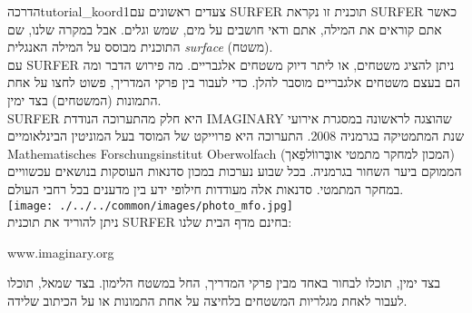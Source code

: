 \begin{surferIntroPage}{הדרכה}{tutorial_koord1}{צעדים ראשונים עם SURFER}
תוכנית זו נקראת SURFER כאשר אתם קוראים את המילה, אתם ודאי חושבים על מים, שמש וגלים. אבל במקרה שלנו, שם התוכנית מבוסס על המילה האנגלית {\it surface} (משטח).
\\
עם SURFER ניתן להציג משטחים, או ליתר דיוק משטחים אלגבריים. מה פירוש הדבר ומה הם בעצם משטחים אלגבריים מוסבר להלן. כדי לעבור בין פרקי המדריך, פשוט לחצו על אחת התמונות (המשטחים) בצד ימין.\\
SURFER היא חלק מהתערוכה הנודדת IMAGINARY שהוצגה לראשונה במסגרת אירועי שנת המתמטיקה בגרמניה 2008. התערוכה היא פרוייקט של המוסד בעל המוניטין הבינלאומיים Mathematisches Forschungsinstitut Oberwolfach (המכון למחקר מתמטי אובֶּרווֹלפַאך) הממוקם ביער השחור בגרמניה. בכל שבוע נערכות במכון סדנאות העוסקות בנושאים עכשוויים במחקר המתמטי. סדנאות אלה מעודדות חילופי ידע בין מדענים בכל רחבי העולם. \\
\vspace{0.2cm} \hspace{3.5cm}\texttt{[image: ./../../common/images/photo\_mfo.jpg]}\\
ניתן להוריד את תוכנית SURFER בחינם מדף הבית שלנו: \\
\begin{centering}
www.imaginary.org\\
\end{centering}
 \vspace{0,2cm}
בצד ימין, תוכלו לבחור באחד מבין פרקי המדריך, החל במשטח הלימון. בצד שמאל, תוכלו לעבור לאחת מגלריות המשטחים בלחיצה על אחת התמונות או על הכיתוב שלידה.
\end{surferIntroPage}
